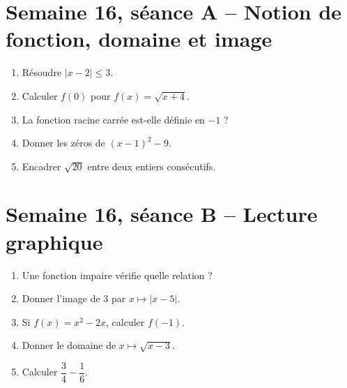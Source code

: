 \section{Semaine 16, séance A -- Notion de fonction, domaine et image}
\begin{enumerate}
  \item Résoudre $|x-2|\leq3$.
  \item Calculer $f(0)$ pour $f(x)=\sqrt{x+4}$.
  \item La fonction racine carrée est-elle définie en $-1$ ?
  \item Donner les zéros de $(x-1)^2-9$.
  \item Encadrer $\sqrt{20}$ entre deux entiers consécutifs.
\end{enumerate}

\section{Semaine 16, séance B -- Lecture graphique}
\begin{enumerate}
  \item Une fonction impaire vérifie quelle relation ?
  \item Donner l'image de $3$ par $x\mapsto|x-5|$.
  \item Si $f(x)=x^2-2x$, calculer $f(-1)$.
  \item Donner le domaine de $x\mapsto\sqrt{x-3}$.
  \item Calculer $\dfrac34-\dfrac16$.
\end{enumerate}
\TeacherOnly{%
\begin{tcolorbox}[colback=VE!3,colframe=VE!35,boxrule=.4pt,arc=1mm]
\small\textit{Réponses.}\quad \textbf{1.} $f(-x)=-f(x)$. \quad \textbf{2.} $2$. \quad \textbf{3.} $3$. \quad \textbf{4.} $[3;+\infty[$. \quad \textbf{5.} $\dfrac7{12}$.
\end{tcolorbox}}

